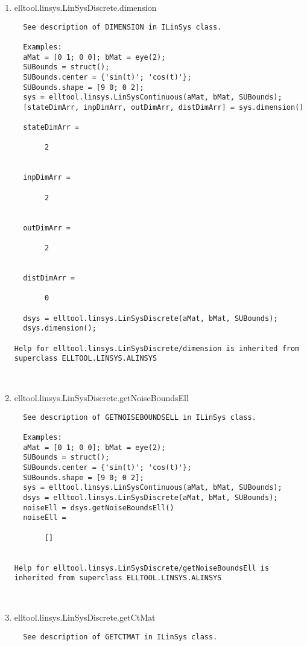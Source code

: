 \begin{enumerate}
\begin{lstlisting}
\end{lstlisting}
\fontfamily{\familydefault}
\selectfont
\item {elltool.linsys.LinSysDiscrete.dimension}
\selectfont
\begin{lstlisting}
  See description of DIMENSION in ILinSys class.

  Examples:
  aMat = [0 1; 0 0]; bMat = eye(2);
  SUBounds = struct();
  SUBounds.center = {'sin(t)'; 'cos(t)'};
  SUBounds.shape = [9 0; 0 2];
  sys = elltool.linsys.LinSysContinuous(aMat, bMat, SUBounds);
  [stateDimArr, inpDimArr, outDimArr, distDimArr] = sys.dimension()

  stateDimArr =

       2


  inpDimArr =

       2


  outDimArr =

       2


  distDimArr =

       0

  dsys = elltool.linsys.LinSysDiscrete(aMat, bMat, SUBounds);
  dsys.dimension();

Help for elltool.linsys.LinSysDiscrete/dimension is inherited from superclass ELLTOOL.LINSYS.ALINSYS



\end{lstlisting}
\fontfamily{\familydefault}
\selectfont
\item {elltool.linsys.LinSysDiscrete.getNoiseBoundsEll}
\selectfont
\begin{lstlisting}
  See description of GETNOISEBOUNDSELL in ILinSys class.

  Examples:
  aMat = [0 1; 0 0]; bMat = eye(2);
  SUBounds = struct();
  SUBounds.center = {'sin(t)'; 'cos(t)'};
  SUBounds.shape = [9 0; 0 2];
  sys = elltool.linsys.LinSysContinuous(aMat, bMat, SUBounds);
  dsys = elltool.linsys.LinSysDiscrete(aMat, bMat, SUBounds);
  noiseEll = dsys.getNoiseBoundsEll()
  noiseEll =

       []


Help for elltool.linsys.LinSysDiscrete/getNoiseBoundsEll is inherited from superclass ELLTOOL.LINSYS.ALINSYS



\end{lstlisting}
\fontfamily{\familydefault}
\selectfont
\item {elltool.linsys.LinSysDiscrete.getCtMat}
\selectfont
\begin{lstlisting}
  See description of GETCTMAT in ILinSys class.


\end{lstlisting}
\end{enumerate}
